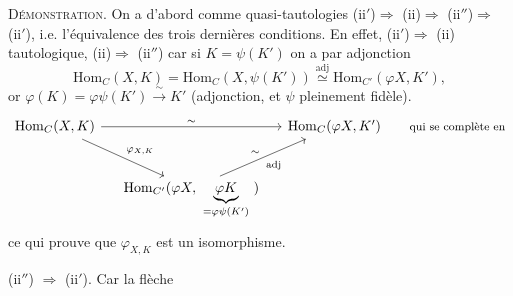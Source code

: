 \documentclass[11pt]{article}
\newcommand{\msp}[1]{\marginpar{\footnotesize [#1]}}
\begin{document}
\textsc{Démonstration.} On a d'abord comme quasi-tautologies (ii$'$)$\Longrightarrow$ (ii)$\Longrightarrow$ (ii$''$)$\Longrightarrow$ (ii$'$), i.e. l'équivalence des trois dernières conditions. En effet, (ii$'$)$\Longrightarrow$ (ii) tautologique, (ii)$\Longrightarrow$ (ii$''$) car si $K=\psi(K')$ on a %
\msp{page 38}
par adjonction
\[
\mathrm{Hom}_C(X,K)=\mathrm{Hom}_C(X,\psi(K'))\overset{\text{adj}}{\simeq}\mathrm{Hom}_{C'}(\varphi X,K'),
\]
or $\varphi(K)=\varphi\psi(K')\xrightarrow{\ \sim\ }K'$ (adjonction, et $\psi$ pleinement fidèle).
\[
\begin{tikzcd}[column sep=small, row sep=large]
\mathrm{Hom}_C(X,K) \arrow[rr, "\sim"] \arrow[dr, "\varphi_{X,K}"] & & \mathrm{Hom}_C(\varphi X,K') & \text{\footnotesize qui se complète en} \\ %
& \mathrm{Hom}_{C'}(\varphi X,\ \underbrace{\varphi K}_{=\varphi\psi(K')}\ ) \arrow[ur, "\sim", "\text{adj}"'] & &
\end{tikzcd}
\]
ce qui prouve que $\varphi_{X,K}$ est un isomorphisme.

(ii$''$) $\Longrightarrow$ (ii$'$). Car la flèche
\end{document}

